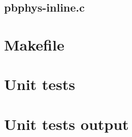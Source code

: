 \begin{scriptsize}
\begin{ttfamily}

\end{ttfamily}
\end{scriptsize}

\subsection{pbphys-inline.c}

\begin{scriptsize}
\begin{ttfamily}

\end{ttfamily}
\end{scriptsize}

\section{Makefile}

\begin{scriptsize}
\begin{ttfamily}

\end{ttfamily}
\end{scriptsize}

\section{Unit tests}

\begin{scriptsize}
\begin{ttfamily}

\end{ttfamily}
\end{scriptsize}

\section{Unit tests output}

\begin{scriptsize}
\begin{ttfamily}

\end{ttfamily}
\end{scriptsize}

